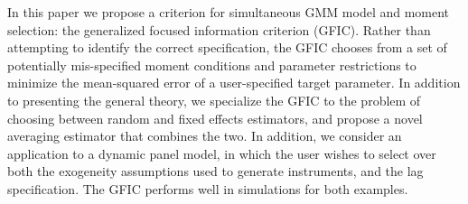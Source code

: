 In this paper we propose a criterion for simultaneous GMM model and moment selection: the generalized focused information criterion (GFIC). 
Rather than attempting to identify the correct specification, the GFIC chooses from a set of potentially mis-specified moment conditions and parameter restrictions to minimize the mean-squared error of a user-specified target parameter.
In addition to presenting the general theory, we specialize the GFIC to the problem of choosing between random and fixed effects estimators, and propose a novel averaging estimator that combines the two.
In addition, we consider an application to a dynamic panel model, in which the user wishes to select over both the exogeneity assumptions used to generate instruments, and the lag specification.
The GFIC performs well in simulations for both examples.

